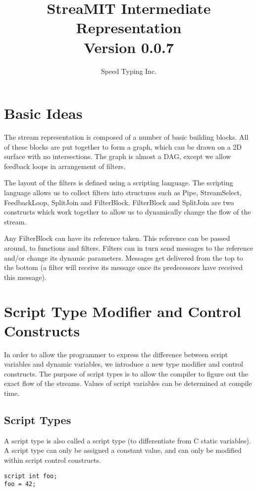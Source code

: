 \documentclass[twocolumn, draft]{article}
\title{StreaMIT Intermediate Representation \\ Version 0.0.7}
\author{Speed Typing Inc.}
\begin{document}
\maketitle

\section{Basic Ideas}

The stream representation is composed of a number of basic building blocks.
All of these blocks are put together to form a graph, which can be drawn
on a 2D surface with no intersections.  The graph is almost a DAG, except
we allow feedback loops in arrangement of filters.

The layout of the filters is defined using a scripting language.  The scripting
language allows us to collect filters into structures such as Pipe,
StreamSelect, FeedbackLoop, SplitJoin and FilterBlock.  FilterBlock and 
SplitJoin are two constructs which work together to allow us to dynamically
change the flow of the stream.

Any FilterBlock can have its reference taken.  This reference can be passed
around, to functions and filters.  Filters can in turn send messages to
the reference and/or change its dynamic parameters.  Messages get delivered
from the top to the bottom (a filter will receive its message once its
predecessors have received this message).

\section{Script Type Modifier and Control Constructs}

In order to allow the programmer to express the difference between
script variables and dynamic variables, we introduce a new type modifier
and control constructs.  The purpose of script types is to allow the compiler
to figure out the exact flow of the streams.  Values of script variables
can be determined at compile time.

\subsection{Script Types}

A script type is also called a script type (to differentiate from C static
variables).  A script type can only be assigned a constant value, and can
only be modified within script control constructs.

\begin{verbatim}
script int foo;
foo = 42;
\end{verbatim}
\end{document}
